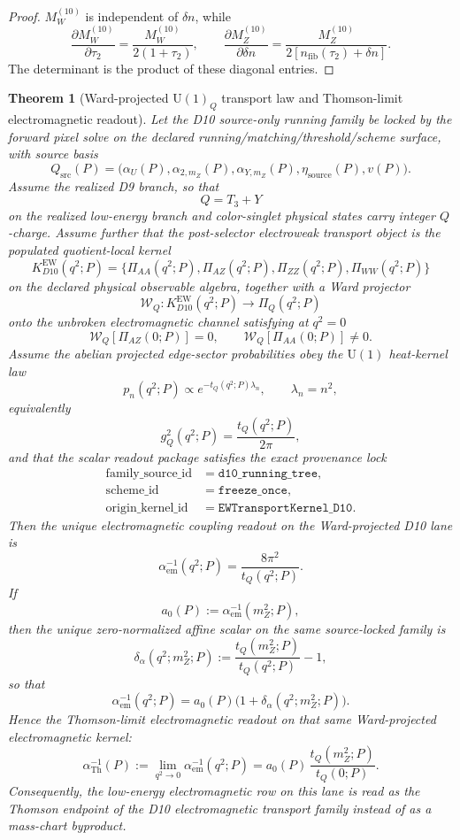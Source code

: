 \documentclass[11pt]{article}
\newtheorem{theorem}{Theorem}[section]
\newcommand{\U}{\mathrm{U}}
\begin{document}
\begin{proof}
\(M_W^{(10)}\) is independent of \(\delta n\), while
\[
\frac{\partial M_W^{(10)}}{\partial\tau_2}
=\frac{M_W^{(10)}}{2(1+\tau_2)},
\qquad
\frac{\partial M_Z^{(10)}}{\partial\delta n}
=\frac{M_Z^{(10)}}{2[n_{\mathrm{fib}}(\tau_2)+\delta n]}.
\]
The determinant is the product of these diagonal entries.
\end{proof}

\begin{theorem}[Ward-projected \texorpdfstring{\(\U(1)_Q\)}{U(1)_Q} transport law and Thomson-limit electromagnetic readout]\label{thm:ward_u1q_transport}
Let the D10 source-only running family be locked by the forward pixel solve on the declared
running/matching/threshold/scheme surface, with source basis
\[
Q_{\mathrm{src}}(P)=
\bigl(\alpha_U(P),\alpha_{2,m_Z}(P),\alpha_{Y,m_Z}(P),
\eta_{\mathrm{source}}(P),v(P)\bigr).
\]
Assume the realized D9 branch, so that
\[
Q=T_3+Y
\]
on the realized low-energy branch and color-singlet physical states carry integer \(Q\)-charge.
Assume further that the post-selector electroweak transport object is the populated quotient-local
kernel
\[
K^{\mathrm{EW}}_{D10}(q^2;P)
=
\bigl\{\Pi_{AA}(q^2;P),\Pi_{AZ}(q^2;P),\Pi_{ZZ}(q^2;P),\Pi_{WW}(q^2;P)\bigr\}
\]
on the declared physical observable algebra, together with a Ward projector
\[
\mathcal W_Q:
K^{\mathrm{EW}}_{D10}(q^2;P)\longrightarrow \Pi_Q(q^2;P)
\]
onto the unbroken electromagnetic channel satisfying at \(q^2=0\)
\[
\mathcal W_Q[\Pi_{AZ}(0;P)]=0,
\qquad
\mathcal W_Q[\Pi_{AA}(0;P)]\neq 0.
\]
Assume the abelian projected edge-sector probabilities obey the \(\U(1)\) heat-kernel law
\[
p_n(q^2;P)\propto e^{-t_Q(q^2;P)\lambda_n},
\qquad
\lambda_n=n^2,
\]
equivalently
\[
g_Q^2(q^2;P)=\frac{t_Q(q^2;P)}{2\pi},
\]
and that the scalar readout package satisfies the exact provenance lock
\[
\begin{aligned}
\text{family\_source\_id} &= \texttt{d10\_running\_tree},\\
\text{scheme\_id} &= \texttt{freeze\_once},\\
\text{origin\_kernel\_id} &= \texttt{EWTransportKernel\_D10}.
\end{aligned}
\]
Then the unique electromagnetic coupling readout on the Ward-projected D10 lane is
\[
\alpha_{\mathrm{em}}^{-1}(q^2;P)=\frac{8\pi^2}{t_Q(q^2;P)}.
\]
If
\[
a_0(P):=\alpha_{\mathrm{em}}^{-1}(m_Z^2;P),
\]
then the unique zero-normalized affine scalar on the same source-locked family is
\[
\delta_\alpha(q^2;m_Z^2;P)
:=
\frac{t_Q(m_Z^2;P)}{t_Q(q^2;P)}-1,
\]
so that
\[
\alpha_{\mathrm{em}}^{-1}(q^2;P)
=
a_0(P)\bigl(1+\delta_\alpha(q^2;m_Z^2;P)\bigr).
\]
Hence the Thomson-limit electromagnetic readout on that same
Ward-projected electromagnetic kernel:
\[
\alpha_{\mathrm{Th}}^{-1}(P)
:=
\lim_{q^2\to0}\alpha_{\mathrm{em}}^{-1}(q^2;P)
=
a_0(P)\,\frac{t_Q(m_Z^2;P)}{t_Q(0;P)}.
\]
Consequently, the low-energy electromagnetic row on this lane is read as the Thomson endpoint of
the D10 electromagnetic transport family instead of as a mass-chart byproduct.
\end{theorem}
\end{document}
